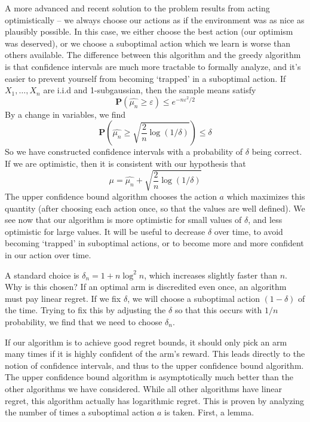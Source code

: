 A more advanced and recent solution to the problem results from acting optimistically -- we always choose our actions as if the environment was as nice as plausibly possible. In this case, we either choose the best action (our optimism was deserved), or we choose a suboptimal action which we learn is worse than others available. The difference between this algorithm and the greedy algorithm is that confidence intervals are much more tractable to formally analyze, and it's easier to prevent yourself from becoming `trapped' in a suboptimal action. If $X_1, \dots, X_n$ are i.i.d and 1-subgaussian, then the sample means satisfy
%
\[ \mathbf{P}(\widehat{\mu_n} \geq \varepsilon) \leq e^{-n\varepsilon^2/2} \]
%
By a change in variables, we find
%
\[ \mathbf{P}\left(\widehat{\mu_n} \geq \sqrt{\frac{2}{n} \log(1/\delta)} \right) \leq \delta \]
%
So we have constructed confidence intervals with a probability of $\delta$ being correct. If we are optimistic, then it is consistent with our hypothesis that
%
\[ \mu = \widehat{\mu_n} + \sqrt{\frac{2}{n} \log(1/\delta)} \]
%
The upper confidence bound algorithm chooses the action $a$ which maximizes this quantity (after choosing each action once, so that the values are well defined). We see now that our algorithm is more optimistic for small values of $\delta$, and less optimistic for large values. It will be useful to decrease $\delta$ over time, to avoid becoming `trapped' in suboptimal actions, or to become more and more confident in our action over time.

A standard choice is $\delta_n = 1 + n \log^2 n$, which increases slightly faster than $n$. Why is this chosen? If an optimal arm is discredited even once, an algorithm must pay linear regret. If we fix $\delta$, we will choose a suboptimal action $(1 - \delta)$ of the time. Trying to fix this by adjusting the $\delta$ so that this occurs with $1/n$ probability, we find that we need to choose $\delta_n$.

If our algorithm is to achieve good regret bounds, it should only pick an arm many times if it is highly confident of the arm's reward. This leads directly to the notion of confidence intervals, and thus to the upper confidence bound algorithm. The upper confidence bound algorithm is asymptotically much better than the other algorithms we have considered. While all other algorithms have linear regret, this algorithm actually has logarithmic regret. This is proven by analyzing the number of times a suboptimal action $a$ is taken. First, a lemma.

